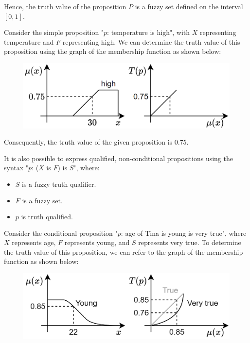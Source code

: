 Hence, the truth value of the proposition $P$ is a fuzzy set defined on the interval $[0,1]$.
\begin{example}
    Consider the simple proposition "$p$: temperature is high", with $X$ representing temperature and $F$ representing high. 
    We can determine the truth value of this proposition using the graph of the membership function as shown below:        
    \begin{figure}[H]
        \centering
        \includegraphics[width=0.5\linewidth]{images/temperature.png}
    \end{figure}
    Consequently, the truth value of the given proposition is 0.75.
\end{example}

It is also possible to express qualified, non-conditional propositions using the syntax "$p$: ($X$ is $F$) is $S$", where:
\begin{itemize}
    \item $S$ is a fuzzy truth qualifier.
    \item $F$ is a fuzzy set.
    \item $p$ is truth qualified.
\end{itemize}
\begin{example}
    Consider the conditional proposition "$p$: age of Tina is young is very true", where $X$ represents age, $F$ represents young, and $S$ represents very true. 
    To determine the truth value of this proposition, we can refer to the graph of the membership function as shown below:
    \begin{figure}[H]
        \centering
        \includegraphics[width=0.5\linewidth]{images/age.png}
    \end{figure}
\end{example}

